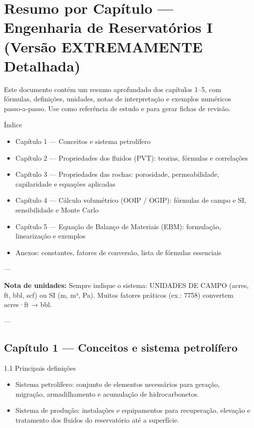 \documentclass[11pt,a4paper]{article}
\begin{document}

\section{Resumo por Capítulo — Engenharia de Reservatórios I (Versão EXTREMAMENTE Detalhada)}

Este documento contém um resumo aprofundado dos capítulos 1–5, com fórmulas, definições, unidades, notas de interpretação e exemplos numéricos passo‑a‑passo. Use como referência de estudo e para gerar fichas de revisão.

Índice
\begin{itemize}
\item Capítulo 1 — Conceitos e sistema petrolífero
\item Capítulo 2 — Propriedades dos fluidos (PVT): teorias, fórmulas e correlações
\item Capítulo 3 — Propriedades das rochas: porosidade, permeabilidade, capilaridade e equações aplicadas
\item Capítulo 4 — Cálculo volumétrico (OOIP / OGIP): fórmulas de campo e SI, sensibilidade e Monte Carlo
\item Capítulo 5 — Equação de Balanço de Materiais (EBM): formulação, linearização e exemplos
\item Anexos: constantes, fatores de conversão, lista de fórmulas essenciais
\end{itemize}

---

\textbf{Nota de unidades:} Sempre indique o sistema: UNIDADES DE CAMPO (acres, ft, bbl, scf) ou SI (m, m³, Pa). Muitos fatores práticos (ex.: 7758) convertem acres·ft → bbl.

---

\subsection{Capítulo 1 — Conceitos e sistema petrolífero}

1.1 Principais definições
\begin{itemize}
\item Sistema petrolífero: conjunto de elementos necessários para geração, migração, armadilhamento e acumulação de hidrocarbonetos.
\item Sistema de produção: instalações e equipamentos para recuperação, elevação e tratamento dos fluidos do reservatório até a superfície.
\end{itemize}
\end{document}
